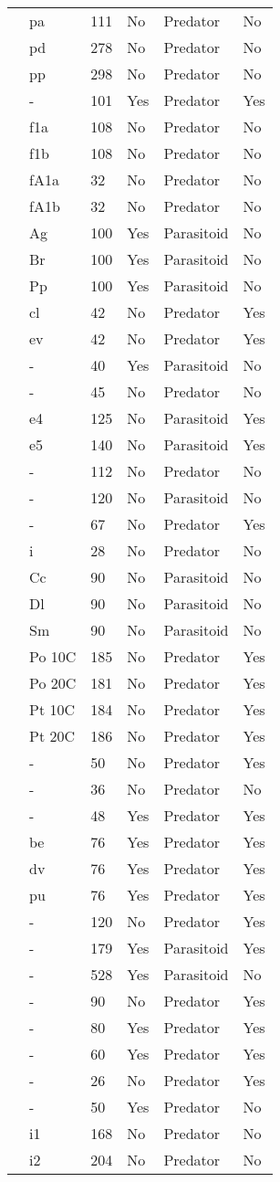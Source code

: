\begin{longtable}{llllll}
\citet{Eveleigh:1982aa}&pa&111&No&Predator&No\tabularnewline
\citet{Eveleigh:1982aa}&pd&278&No&Predator&No\tabularnewline
\citet{Eveleigh:1982aa}&pp&298&No&Predator&No\tabularnewline
\citet{Fussmann:2005aa}&-&101&Yes&Predator&Yes\tabularnewline
\citet{Griffen:2007aa}&f1a&108&No&Predator&No\tabularnewline
\citet{Griffen:2007aa}&f1b&108&No&Predator&No\tabularnewline
\citet{Griffen:2007aa}&fA1a&32&No&Predator&No\tabularnewline
\citet{Griffen:2007aa}&fA1b&32&No&Predator&No\tabularnewline
\citet{Hassan:1976aa}&Ag&100&Yes&Parasitoid&No\tabularnewline
\citet{Hassan:1976aa}&Br&100&Yes&Parasitoid&No\tabularnewline
\citet{Hassan:1976aa}&Pp&100&Yes&Parasitoid&No\tabularnewline
\citet{Hossie:2016aa}&cl&42&No&Predator&Yes\tabularnewline
\citet{Hossie:2016aa}&ev&42&No&Predator&Yes\tabularnewline
\citet{Huffaker:1982aa}&-&40&Yes&Parasitoid&No\tabularnewline
\citet{Johnson:2006aa}&-&45&No&Predator&No\tabularnewline
\citet{Jones:1988aa}&e4&125&No&Parasitoid&Yes\tabularnewline
\citet{Jones:1988aa}&e5&140&No&Parasitoid&Yes\tabularnewline
\citet{Katz:1985ai}&-&112&No&Predator&No\tabularnewline
\citet{Kfir:1983aa}&-&120&No&Parasitoid&No\tabularnewline
\citet{Kratina:2009aa}&-&67&No&Predator&Yes\tabularnewline
\citet{Krylov:1992aa}&i&28&No&Predator&No\tabularnewline
\citet{Kumar:1985aa}&Cc&90&No&Parasitoid&No\tabularnewline
\citet{Kumar:1985aa}&Dl&90&No&Parasitoid&No\tabularnewline
\citet{Kumar:1985aa}&Sm&90&No&Parasitoid&No\tabularnewline
\citet{Lang:2012aa}&Po 10C&185&No&Predator&Yes\tabularnewline
\citet{Lang:2012aa}&Po 20C&181&No&Predator&Yes\tabularnewline
\citet{Lang:2012aa}&Pt 10C&184&No&Predator&Yes\tabularnewline
\citet{Lang:2012aa}&Pt 20C&186&No&Predator&Yes\tabularnewline
\citet{Long:2012aa}&-&50&No&Predator&Yes\tabularnewline
\citet{Mansour:1991aa}&-&36&No&Predator&No\tabularnewline
\citet{Medoc:2013aa}&-&48&Yes&Predator&Yes\tabularnewline
\citet{Medoc:2015aa}&be&76&Yes&Predator&Yes\tabularnewline
\citet{Medoc:2015aa}&dv&76&Yes&Predator&Yes\tabularnewline
\citet{Medoc:2015aa}&pu&76&Yes&Predator&Yes\tabularnewline
\citet{Mertz:1968aa}&-&120&No&Predator&Yes\tabularnewline
\citet{Mills:2004aa}&-&179&Yes&Parasitoid&Yes\tabularnewline
\citet{Montoya:2000aa}&-&528&Yes&Parasitoid&No\tabularnewline
\citet{Omkar:2004aa}&-&90&No&Predator&Yes\tabularnewline
\citet{Prokopenko:2017aa}&-&80&Yes&Predator&Yes\tabularnewline
\citet{Pusack:2018aa}&-&60&Yes&Predator&Yes\tabularnewline
\citet{Reeve:1997aa}&-&26&No&Predator&Yes\tabularnewline
\citet{Salt:1974aa}&-&50&Yes&Predator&No\tabularnewline
\citet{Uttley:1980aa}&i1&168&No&Predator&No\tabularnewline
\citet{Uttley:1980aa}&i2&204&No&Predator&No\tabularnewline

\end{longtable}
